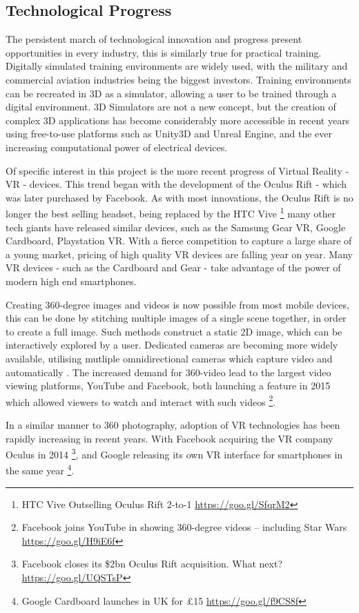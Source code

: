 \documentclass[a4paper, openright, twoside]{book}
\begin{document}
\subsection{Technological Progress} \label{tech_progress}
The persistent march of technological innovation and progress present opportunities in every  industry, this is similarly true for practical training. Digitally simulated training environments are widely used, with the military and commercial aviation industries being the biggest investors. Training environments can be recreated in 3D as a simulator, allowing a user to be trained through a digital environment. 3D Simulators are not a new concept, but the creation of complex 3D applications has become considerably more accessible in recent years using free-to-use platforms such as Unity3D and Unreal Engine, and the ever increasing computational power of electrical devices. 

Of specific interest in this project is the more recent progress of Virtual Reality - VR - devices. This trend began with the development of the Oculus Rift - which was later purchased by Facebook. As with most innovations, the Oculus Rift is no longer the best selling headset, being replaced by the HTC Vive \footnote{HTC Vive Outselling Oculus Rift 2-to-1 \url{https://goo.gl/SfqrM2}} many other tech giants have released similar devices, such as the Samsung Gear VR, Google Cardboard, Playstation VR. With a fierce competition to capture a large share of a young market, pricing of high quality VR devices are falling year on year. Many VR devices - such as the Cardboard and Gear - take advantage of the power of modern high end smartphones. 

Creating 360-degree images and videos is now possible from most mobile devices, this can be done by stitching multiple images of a single scene together, in order to create a full image. Such methods construct a static 2D image, which can be interactively explored by a user. Dedicated cameras are becoming more widely available, utilising mutliple omnidirectional cameras which capture video and automatically . The increased demand for 360-video lead to the largest video viewing platforms, YouTube and Facebook, both launching a feature in 2015 which allowed viewers to watch and interact with such videos \footnote{Facebook joins YouTube in showing 360-degree videos – including Star Wars \url{https://goo.gl/H9iE6f}}. 

In a similar manner to 360 photography, adoption of VR technologies has been rapidly increasing in recent years. With Facebook acquiring the VR company Oculus in 2014 \footnote{Facebook closes its \$2bn Oculus Rift acquisition. What next? \url{https://goo.gl/UQSTsP}}, and Google releasing its own VR interface for smartphones in the same year \footnote{Google Cardboard launches in UK for £15 \url{https://goo.gl/f9CS8f}}.  
\end{document}
